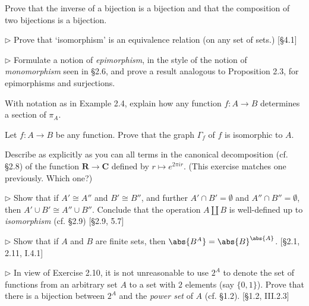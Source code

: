 \begin{problem}
  Prove that the inverse of a bijection is a bijection and that the
  composition of two bijections is a bijection.
\end{problem}

\begin{problem}
  $\rhd$ Prove that `isomorphism' is an equivalence relation (on any set
  of sets.) [\S4.1]
\end{problem}

\begin{problem}
  $\rhd$ Formulate a notion of \textit{epimorphism}, in the style
  of the notion of \textit{monomorphism} seen in \S 2.6, and prove a result
  analogous to Proposition 2.3, for epimorphisms and surjections.
\end{problem}

\begin{problem}
  With notation as in Example 2.4, explain how any function $f:A\to B$
  determines a section of $\pi_A$.
\end{problem}

\begin{problem}
  Let $f:A\to B$ be any function. Prove that the graph $\Gamma_f$ of $f$ is
  isomorphic to $A$.
\end{problem}

\begin{problem}
  Describe as explicitly as you can all terms in the canonical decomposition
  (cf. \S2.8) of the function $\mathbf{R}\to\mathbf{C}$ defined by $r\mapsto
  e^{2\pi ir}$. (This exercise matches one previously. Which one?)
\end{problem}

\begin{problem}
  $\rhd$ Show that if $A'\cong A''$ and $B'\cong B''$, and further
  $A'\cap B'=\emptyset$ and $A''\cap B''=\emptyset$, then
  $A'\cup B'\cong A''\cup B''$. Conclude that the operation $A\amalg B$
  is well-defined up to \textit{isomorphism} (cf. \S2.9) [\S2.9, 5.7]
\end{problem}

\begin{problem}
  $\rhd$ Show that if $A$ and $B$ are finite sets, then $\abs{B^A} =
  \abs{B}^{\abs{A}}$. [\S2.1, 2.11, I.4.1]
\end{problem}

\begin{problem}
  $\rhd$ In view of Exercise 2.10, it is not unreasonable to use $2^A$ to
  denote the set of functions from an arbitrary set $A$ to a set with $2$
  elements (say $\{0,1\}$). Prove that there is a bijection between $2^A$
  and the \textit{power set} of $A$ (cf. \S1.2). [\S1.2, III.2.3]
\end{problem}

